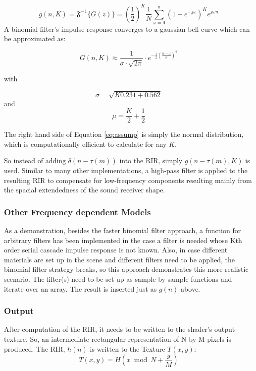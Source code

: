\documentclass[twoside,a4paper]{article}
\begin{document}
\begin{equation}
  g(n,K) = \mathfrak{F}^{-1}\{ G(z) \} = (\frac{1}{2})^K \frac{1}{N}  \sum_{\omega = 0}^\pi (1+e^{-j\omega})^{K} e^{j\omega n} 
\end{equation}
A binomial filter's impulse response converges to a gaussian bell curve which can be approximated as:

\begin{equation}
G(n,K) \approx  \frac{1}{\sigma \cdot \sqrt{2 \pi}} \cdot e ^{-\frac{1}{2} (\frac{n-\mu}{\sigma})^2}
\label{eq:assump}
\end{equation}


with 

\begin{equation}
\sigma = \sqrt{K 0.231 + 0.562}
\end{equation}
and 
\begin{equation}
\mu = \frac{K}{2} + \frac{1}{2}
\end{equation}

The right hand side of Equation \ref{eq:assump} is simply the normal distribution, which is computationally efficient to calculate for any $K$.

So instead of adding $\delta(n-\tau(m))$ into the RIR, simply $g(n-\tau(m),K)$ is used. 
Similar to many other implementations, a high-pass filter is applied to the resulting RIR to compensate for low-frequency components resulting mainly from the spacial extendedness of the sound receiver shape.

\subsubsection*{Other Frequency dependent Models}
As a demonstration, besides the faster binomial filter approach, a function for arbitrary filters has been implemented in the case a filter is needed whose Kth order serial cascade impulse response is not known. Also, in case different materials are set up in the scene and different filters need to be applied, the binomial filter strategy breaks, so this approach demonstrates this more realistic scenario. The filter(s) need to be set up as sample-by-sample functions and iterate over an array. The result is inserted just as $g(n)$ above.

\subsubsection*{Output}
After computation of the RIR, it needs to be written to the shader's output texture. So, an intermediate rectangular representation of N by M pixels is produced. The RIR, $h(n)$ is written to the Texture $T(x,y)$:
\begin{equation}
  T(x,y) = H(x \bmod N+\frac{y}{M})
\end{equation}
\end{document}
